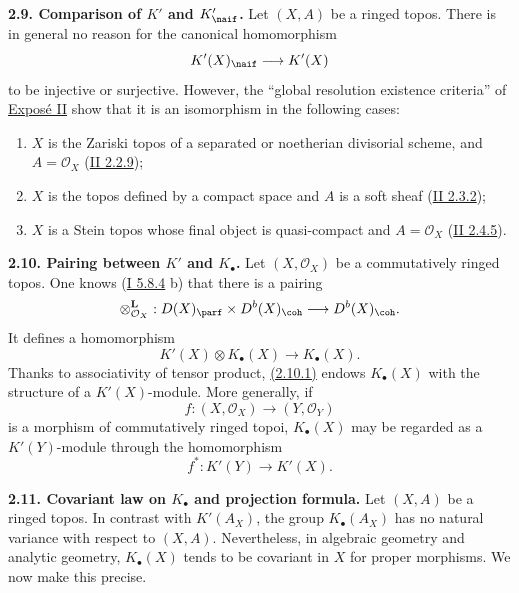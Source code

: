 \textbf{2.9. Comparison of \(K'\) and \(K'_{\naif}\).} Let \((X,A)\) be a ringed topos. There is in general no reason for the canonical homomorphism
\[
 K'(X)_{\naif}\longrightarrow K'(X)
\]
to be injective or surjective. However, the ``global resolution existence criteria'' of \hyperlink{sga6.e02.expose}{Exposé II} show that it is an isomorphism in the following cases:
\begin{enumerate}[label=(\roman*)]
\item \(X\) is the Zariski topos of a separated or noetherian divisorial scheme, and \(A=\mathcal O_X\) (\hyperlink{sga6.e02.prop.2-2-9}{II 2.2.9});
\item \(X\) is the topos defined by a compact space and \(A\) is a soft sheaf (\hyperlink{sga6.e02.prop.2-3-2}{II 2.3.2});
\item \(X\) is a Stein topos whose final object is quasi-compact and \(A=\mathcal O_X\) (\hyperlink{sga6.e02.prop.2-4-5}{II 2.4.5}).
\end{enumerate}

\textbf{2.10. Pairing between \(K'\) and \(K_{\bullet}\).} Let \((X,\mathcal O_X)\) be a commutatively ringed topos. One knows (\hyperlink{sga6.e01.rem.5-8-4}{I 5.8.4} b) that there is a pairing
\[
 \otimes_{\mathcal O_X}^{\mathbf L}:D(X)_{\parf}\times D^b(X)_{\coh}
 \longrightarrow D^b(X)_{\coh}.
\]
It defines a homomorphism
\begin{equation}\tag{2.10.1}
 K'(X)\otimes K_{\bullet}(X)\longrightarrow K_{\bullet}(X).
\end{equation}
Thanks to associativity of tensor product, \hyperlink{sga6.e04.eq.2-10-1}{(2.10.1)} endows \(K_{\bullet}(X)\) with the structure of a \(K'(X)\)-module. More generally, if
\[
 f:(X,\mathcal O_X)\longrightarrow (Y,\mathcal O_Y)
\]
is a morphism of commutatively ringed topoi, \(K_{\bullet}(X)\) may be regarded as a \(K'(Y)\)-module through the homomorphism
\[
 f^*:K'(Y)\longrightarrow K'(X).
\]

\textbf{2.11. Covariant law on \(K_{\bullet}\) and projection formula.} Let \((X,A)\) be a ringed topos. In contrast with \(K'(A_X)\), the group \(K_{\bullet}(A_X)\) has no natural variance with respect to \((X,A)\). Nevertheless, in algebraic geometry and analytic geometry, \(K_{\bullet}(X)\) tends to be covariant in \(X\) for proper morphisms. We now make this precise.

